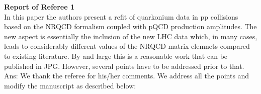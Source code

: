 \documentclass[aps,prc,preprint,superscriptaddress,showpacs,showkeys,amsmath]{revtex4-1}
\begin{document}

{\bf Report of Referee 1 } \\


In this paper the authors present a refit of quarkonium data in pp collisions
based on the NRQCD formalism coupled with pQCD production amplitudes. 
The new aspect is essentially the inclusion of the new LHC data
which, in many cases, leads to considerably different values of the NRQCD
matrix elemnets compared to existing literature.
By and large this is a reasonable work that can be published in JPG. However,
several points have to be addressed prior to that.\\
{\color{blue}
Ans: We thank the referee for his/her comments. We address all the points and modify the 
manuscript as described below:\\}
\end{document}
